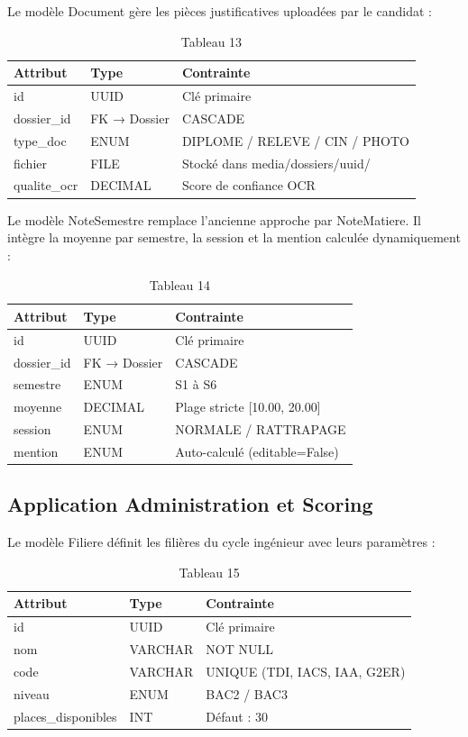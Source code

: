 Le modèle Document gère les pièces justificatives uploadées par le candidat :

\begin{table}[htbp]
\centering
\begin{tabular}{|l|l|l|}
\hline
Attribut & Type & Contrainte \\
\hline
id & UUID & Clé primaire \\
\hline
dossier\_id & FK → Dossier & CASCADE \\
\hline
type\_doc & ENUM & DIPLOME / RELEVE / CIN / PHOTO \\
\hline
fichier & FILE & Stocké dans media/dossiers/{uuid}/ \\
\hline
qualite\_ocr & DECIMAL & Score de confiance OCR \\
\hline
\end{tabular}
\caption{Tableau 13}
\label{tab:table_13}
\end{table}

Le modèle NoteSemestre remplace l'ancienne approche par NoteMatiere. Il intègre la moyenne par semestre, la session et la mention calculée dynamiquement :

\begin{table}[htbp]
\centering
\begin{tabular}{|l|l|l|}
\hline
Attribut & Type & Contrainte \\
\hline
id & UUID & Clé primaire \\
\hline
dossier\_id & FK → Dossier & CASCADE \\
\hline
semestre & ENUM & S1 à S6 \\
\hline
moyenne & DECIMAL & Plage stricte [10.00, 20.00] \\
\hline
session & ENUM & NORMALE / RATTRAPAGE \\
\hline
mention & ENUM & Auto-calculé (editable=False) \\
\hline
\end{tabular}
\caption{Tableau 14}
\label{tab:table_14}
\end{table}

\subsection{Application Administration et Scoring}

Le modèle Filiere définit les filières du cycle ingénieur avec leurs paramètres :

\begin{table}[htbp]
\centering
\begin{tabular}{|l|l|l|}
\hline
Attribut & Type & Contrainte \\
\hline
id & UUID & Clé primaire \\
\hline
nom & VARCHAR & NOT NULL \\
\hline
code & VARCHAR & UNIQUE (TDI, IACS, IAA, G2ER) \\
\hline
niveau & ENUM & BAC2 / BAC3 \\
\hline
places\_disponibles & INT & Défaut : 30 \\
\hline
\end{tabular}
\caption{Tableau 15}
\label{tab:table_15}
\end{table}


